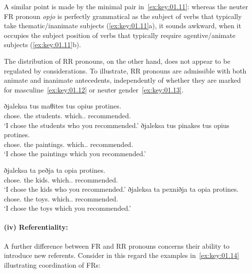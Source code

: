 \documentclass[output=paper]{langsci/langscibook}
\begin{document}
A similar point is made by the minimal pair in~\eqref{ex:key:01.11}: whereas
the neuter \gls{FR} pronoun \emph{opjo} is perfectly grammatical as the subject
of verbs that typically take thematic/inanimate subjects (\ref{ex:key:01.11}a),
it sounds awkward, when it occupies the subject position of verbs that
typically require agentive/animate subjects (\ref{ex:key:01.11}b).

\ea {}\label{ex:key:01.11}
	\z
\z

The distribution of \gls{RR} pronouns, on the other hand, does not appear to be
regulated by  considerations. To illustrate, \gls{RR} pronouns are
admissible with both animate and inanimate antecedents, independently of
whether they are marked for masculine~\eqref{ex:key:01.12} or neuter
gender~\eqref{ex:key:01.13}.

\ea {}\label{ex:key:01.12}
	\ea
		\gll ðjaleksa tus maθites {tus opius} protines.\\
			chose.\Fsg{} the students.\Acc{} which.\M{}.\Pl{} recommended.\Ssg{}\\
		\glt ‘I chose the students who you recommended.'
	\ex
		\gll ðjaleksa tus pinakes {tus opius} protines.\\
			chose.\Fsg{} the paintings.\Acc{} which.\M{}.\Pl{} recommended.\Ssg{}\\
		\glt \enquote*{I chose the paintings which you recommended.}
	\z
\z

\ea {}\label{ex:key:01.13}
	\ea
		\gll ðjaleksa ta peðja {ta opia} protines.\\
			chose.\Fsg{} the kids.\Acc{} which.\glossN.\Pl{} recommended.\Ssg{}\\
		\glt ‘I chose the kids who you recommended.'
	\ex
		\gll ðjaleksa ta pexniðja {ta opia} protines.\\
			chose.\Fsg{} the toys.\Acc{} which.\glossN.\Pl{} recommended.\Ssg{}\\
		\glt ‘I chose the toys which you recommended.'
	\z
\z

\paragraph*{(iv) Referentiality:} A further difference between \gls{FR} and
\gls{RR} pronouns concerns their ability to introduce new referents.
Consider in this regard the examples in~\eqref{ex:key:01.14} illustrating
coordination of \glspl{FR}:\newpage
\end{document}
